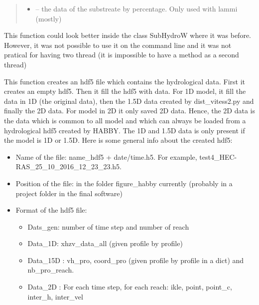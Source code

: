 \documentclass[letterpaper,10pt,english]{sphinxmanual}
\begin{document}
\begin{fulllineitems}
\begin{quote}
\begin{description}
\begin{itemize}
\item {} 
 -- the data of the substreate by percentage. Only used with lammi (mostly)

\end{itemize}

\end{description}\end{quote}


This function could look better inside the class SubHydroW where it was before. However, it was not possible
to use it on the command line and it was not pratical for having two thread (it is impossible to have a method
as a second thread)

This function creates an hdf5 file which contains the hydrological data. First it creates an empty hdf5.
Then it fill the hdf5 with data. For 1D model, it fill the data in 1D (the original data), then the 1.5D data
created by dist\_vitess2.py and finally the 2D data. For model in 2D it only saved 2D data. Hence, the 2D data
is the data which is common to all model and which can always be loaded from a hydrological hdf5 created by
HABBY. The 1D and 1.5D data is only present if the model is 1D or 1.5D. Here is some general info about the
created hdf5:
\begin{itemize}
\item {} 
Name of the file: name\_hdf5  + date/time.h5.  For example, test4\_HEC-RAS\_25\_10\_2016\_12\_23\_23.h5.

\item {} 
Position of the file: in the folder  figure\_habby currently (probably in a project folder in the final software)

\item {} 
Format of the hdf5 file:
\begin{itemize}
\item {} 
Dats\_gen:  number of time step and number of reach

\item {} 
Data\_1D:  xhzv\_data\_all (given profile by profile)

\item {} 
Data\_15D :  vh\_pro, coord\_pro (given profile by profile in a dict) and nb\_pro\_reach.

\item {} 
Data\_2D : For each time step, for each reach: ikle, point, point\_c, inter\_h, inter\_vel


\end{itemize}
\end{itemize}
\end{fulllineitems}
\end{document}
